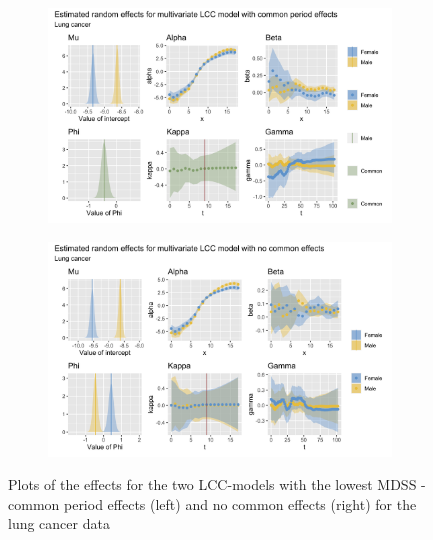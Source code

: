 \begin{figure}[h!]
    \centering
    \begin{subfigure}[b]{.45\linewidth}
        \includegraphics[width=\linewidth]{real-data/real-data-multivariate/Figures/effects-LCC-common-period-lung.png}
    \end{subfigure}
    \begin{subfigure}[b]{.45\linewidth}
        \includegraphics[width=\linewidth]{real-data/real-data-multivariate/Figures/effects-LCC-no-common-lung.png}
    \end{subfigure}
    \caption{Plots of the effects for the two LCC-models with the lowest MDSS - common period effects (left) and no common effects (right) for the lung cancer data}
    \label{fig:effects-LCC-lung}
\end{figure}

